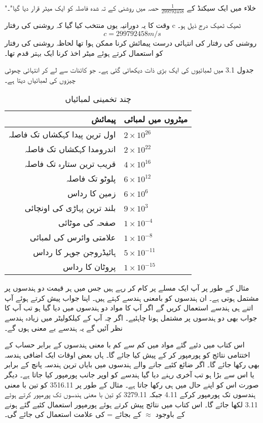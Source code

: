 	"خلاء میں ایک سیکنڈ کے \(\frac{1}{299792458}\) حصہ میں روشنی کے تہ شدہ فاصلہ کو ایک میٹر قرار دیا گیا"۔
	
	وقت کا یہ دورانیہ یوں منتخب کیا گیا کہ روشنی کی رفتار c ٹھیک ٹھیک درج ذیل ہو۔
	\[c = 299792458 m/s\]
	روشنی کی رفتار کی انتہائی درست پیمائش کرنا ممکن ہوا تھا لحاظہ روشنی کی رفتار کو استعمال کرتے ہوئے میٹر اخذ کرنا ایک بہتر قدم تھا۔
	
	جدول 3.1 میں لمبائیوں کی ایک بڑی ذات دیکھائی گئی ہے۔ جو کائنات سے لے کر انتہائی چھوٹی چیزوں کی لمبائیاں دیتا ہے۔
	\begin{table}[h!]
	\caption{چند تخمینی لمبائیاں}
\label{جدول_پیمائش_چند_تخمینی_لمائیاں}
\centering
\begin{tabular}{r l} 
	\toprule
  پیمائش& میٹروں میں لمبائی\\
\midrule
 اول ترین  پیدا کہکشاں تک فاصلہ& $2\times 10^{26}$ \\
  اندرومدا کہکشاں تک فاصلہ & $2\times 10^{22}$\\
  قریب ترین ستارہ تک فاصلہ & $4\times 10^{16}$\\
  پلوٹو تک فاصلہ & $6\times 10^{12}$\\
 زمین کا رداس & $6\times 10^{6}$ \\
  بلند ترین پہاڑی کی  اونچائی & $9\times 10^{3}$\\
 صفحہ کی موٹائی &  $1\times 10^{-4}$\\
  علامتی وائرس کی لمبائی & $1\times 10^{-8}$\\
  ہائیڈروجن  جوہر کا رداس & $5\times 10^{-11}$\\
  پروٹان کا رداس & $1\times 10^{-15}$\\
\bottomrule
		\end{tabular}
	\end{table}


	مثال کے طور پر آپ ایک مسلے پر کام کر رہے ہیں جس میں ہر قیمت دو ہندسوں پر مشتمل ہوتی ہے۔ ان ہندسوں کو بامعنی ہندسے کہتے ہیں۔ اپنا جواب پیش کرتے ہوئے آپ اتنے ہی ہندسے استعمال کریں گے اگر آپ کا مواد دو ہندسوں میں دیا گیا ہو تب آپ کا جواب بھی دو ہندسوں پر مشتمل ہونا چاہئیے۔ اگر چہ آپ کے کیلکولیٹر میں زیادہ ہندسے نظر آئیں گے یہ ہندسے بے معنی ہوں گے۔
	
	اس کتاب میں دئیے گئے مواد میں کم سے کم با معنی ہندسوں کے برابر حساب کے اختتامی نتائج کو پورمپور کر کے پیش کیا جائے گا۔ ہاں بعض اوقات ایک اضافی ہندسہ بھی رکھا جائے گا۔ اگر ضائع کئیے جانے والے ہندسوں میں بایاں ترین ہندسہ پانچ کے برابر یا اس سے بڑا ہو تب آخری رہنے دیا گیا ہندسے کو اوپر جانب پورمپور کیا جاتا ہے۔ دیگر صورت اس کو اپنے حال میں ہی رکھا جاتا ہے۔ مثال کے طور پر 3516.11 کو تین با معنی ہندسوں تک پورمپور کرکے 4.11 جبکہ 3279.11 کو تین با معنی ہندسوں تک پورمپور کرتے ہوئے 3.11 لکھا جائے گا۔ اس کتاب میں نتائج پیش کرتے ہوئے پورمپور استعمال کئیے گئے ہونے کے باوجود $\approx$ کے بجائے = کی علامت استعمال کی جائے گی۔
	
